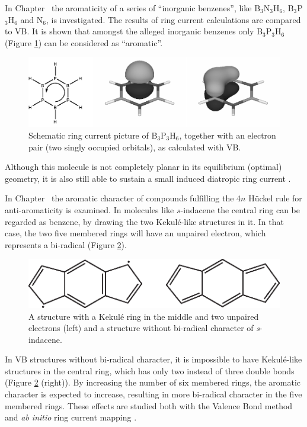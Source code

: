 In Chapter \chinorganic\ the aromaticity of a series of ``inorganic benzenes'', like B$_3$N$_3$H$_6$, B$_3$P$_3$H$_6$ and N$_6$, is investigated. The results of ring current calculations are compared to VB. It is shown that amongst the alleged inorganic benzenes only B$_3$P$_3$H$_6$ (Figure \ref{ch1.fig.b3p3h6}) can be considered as ``aromatic''.
 \begin{figure}[ht]
\center
\includegraphics[width=5in]{introduction/figures/b3p3h6.eps}
\caption{Schematic ring current picture of B$_3$P$_3$H$_6$, together with an electron pair (two singly occupied orbitals), as calculated with VB.}
\label{ch1.fig.b3p3h6}
\end{figure}
 Although this molecule is not completely planar in its equilibrium (optimal) geometry, it is also still able to sustain a small induced diatropic ring current \cite{inorganic}.

In Chapter \chindacene\ the aromatic character of compounds fulfilling the 4$n$ H\"{u}ckel rule for anti-aromaticity is examined. In molecules like $s$-indacene the central ring can be regarded as benzene, by drawing the two Kekul\'e-like structures in it. In that case, the two five membered rings will have an unpaired electron, which represents a bi-radical (Figure \ref{ch1.fig.indacene}). 
\begin{figure}[htdp]
\center
\includegraphics{introduction/figures/indacene.eps}
\caption{A structure with a Kekul\'e ring in the middle and two unpaired electrons (left) and a structure without bi-radical character of \textit{s}-indacene.}
\label{ch1.fig.indacene}
\end{figure}
In VB structures without bi-radical character, it is impossible to have Kekul\'e-like structures in the central ring, which has only two instead of three double bonds (Figure \ref{ch1.fig.indacene} (right)). By increasing the number of six membered rings, the aromatic character is expected to increase, resulting in more bi-radical character in the five membered rings. These effects are studied both with the Valence Bond method and \textit{ab initio} ring current mapping \cite{indacene}.  


 

